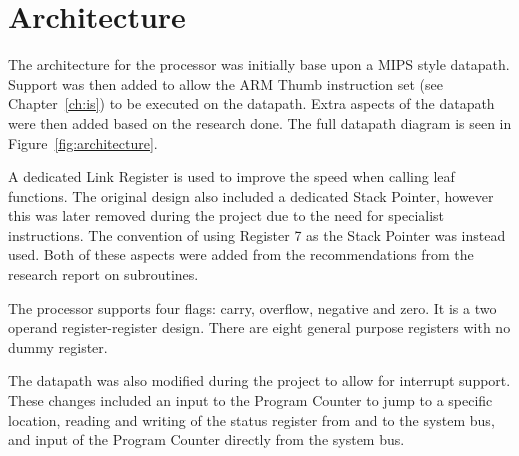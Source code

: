

\section{Architecture}




The architecture for the processor was initially base upon a MIPS style datapath.
Support was then added to allow the ARM Thumb instruction set (see Chapter~\ref{ch:is}) to be executed on the datapath.
Extra aspects of the datapath were then added based on the research done. 
The full datapath diagram is seen in Figure~\ref{fig:architecture}.

A dedicated Link Register is used to improve the speed when calling leaf functions.
The original design also included a dedicated Stack Pointer, however this was later removed during the project due to the need for specialist instructions.
The convention of using Register 7 as the Stack Pointer was instead used. 
Both of these aspects were added from the recommendations from the research report on subroutines.

The processor supports four flags: carry, overflow, negative and zero. 
It is a two operand register-register design.
There are eight general purpose registers with no dummy register. 

The datapath was also modified during the project to allow for interrupt support.
These changes included an input to the Program Counter to jump to a specific location, reading and writing of the status register from and to the system bus, and input of the Program Counter directly from the system bus. 


